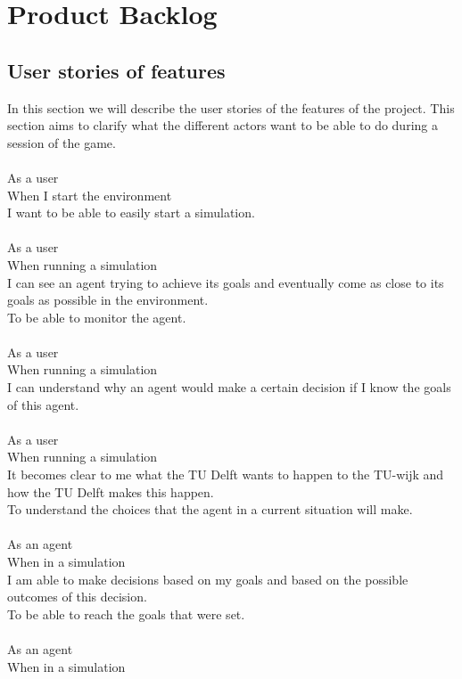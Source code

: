 \section{Product Backlog}

\subsection{User stories of features}

In this section we will describe the user stories of the features of the project. This section aims to clarify what the different actors want to be able to do during a session of the game.\\
\\
As a user\\
When I start the environment\\
I want to be able to easily start a simulation.\\
\\
As a user\\
When running a simulation\\
I can see an agent trying to achieve its goals and eventually come as close to its goals as possible in the environment.\\
To be able to monitor the agent.\\
\\
As a user\\
When running a simulation\\
I can understand why an agent would make a certain decision if I know the goals of this agent.\\
\\
As a user\\
When running a simulation\\
It becomes clear to me what the TU Delft wants to happen to the TU-wijk and how the TU Delft makes this happen.\\
To understand the choices that the agent in a current situation will make.\\
\\
As an agent\\
When in a simulation\\
I am able to make decisions based on my goals and based on the possible outcomes of this decision.\\
To be able to reach the goals that were set.\\
\\
As an agent\\
When in a simulation\\

